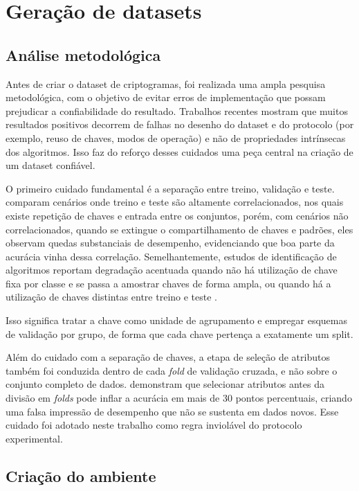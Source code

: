 \section{Geração de datasets}
\subsection{Análise metodológica}
Antes de criar o dataset de criptogramas, foi realizada uma ampla pesquisa metodológica, com o objetivo de evitar erros de implementação que possam prejudicar a confiabilidade do resultado. Trabalhos recentes mostram que muitos resultados positivos decorrem de falhas no desenho do dataset e do protocolo (por exemplo, reuso de chaves, modos de operação) e não de propriedades intrínsecas dos algoritmos. Isso faz do reforço desses cuidados uma peça central na criação de um dataset confiável.

O primeiro cuidado fundamental é a separação entre treino, validação e teste. \cite{jeong2024} comparam cenários onde treino e teste são altamente correlacionados, nos quais existe repetição de chaves e entrada entre os conjuntos, porém, com cenários não correlacionados, quando se extingue o compartilhamento de chaves e padrões, eles observam quedas substanciais de desempenho, evidenciando que boa parte da acurácia vinha dessa correlação. Semelhantemente, estudos de identificação de algoritmos reportam degradação acentuada quando não há utilização de chave fixa por classe e se passa a amostrar chaves de forma ampla, ou quando há a utilização de chaves distintas entre treino e teste \cite{yuan2022, sikdar_kule_2024}.

Isso significa tratar a chave como unidade de agrupamento e empregar esquemas de validação por grupo, de forma que cada chave pertença a exatamente um split.

Além do cuidado com a separação de chaves, a etapa de seleção de atributos também foi conduzida dentro de cada \textit{fold} de validação cruzada, e não sobre o conjunto completo de dados. \cite{ambroise_mclachlan_2002} demonstram que selecionar atributos antes da divisão em \textit{folds} pode inflar a acurácia em mais de 30 pontos percentuais, criando uma falsa impressão de desempenho que não se sustenta em dados novos. Esse cuidado foi adotado neste trabalho como regra inviolável do protocolo experimental.



\subsection{Criação do ambiente}

